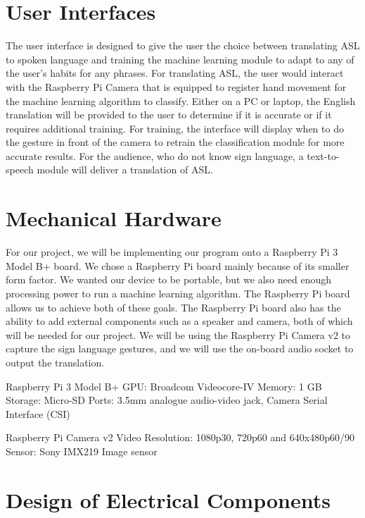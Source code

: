 \documentclass[12pt, titlepage]{article}
\begin{document}
\section{User Interfaces}

The user interface is designed to give the user the choice between translating ASL to spoken language and training the machine learning module to adapt 
to any of the user’s habits for any phrases. For translating ASL, the user would interact with the Raspberry Pi Camera that is equipped to register hand 
movement for the machine learning algorithm to classify. Either on a PC or laptop, the English translation will be provided to the user to determine if 
it is accurate or if it requires additional training. For training, the interface will display when to do the gesture in front of the camera to retrain 
the classification module for more accurate results. For the audience, who do not know sign language, a text-to-speech module will deliver a translation of ASL.

\section{Mechanical Hardware}

For our project, we will be implementing our program onto a Raspberry Pi 3 Model B+ board. We chose a Raspberry Pi board mainly because of its smaller form 
factor. We wanted our device to be portable, but we also need enough processing power to run a machine learning algorithm. The Raspberry Pi board allows us 
to achieve both of these goals. The Raspberry Pi board also has the ability to add external components such as a speaker and camera, both of which will be 
needed for our project. We will be using the Raspberry Pi Camera v2 to capture the sign language gestures, and we will use the on-board audio socket to output 
the translation.

Raspberry Pi 3 Model B+
GPU: Broadcom Videocore-IV
Memory: 1 GB
Storage: Micro-SD
Ports: 3.5mm analogue audio-video jack, Camera Serial Interface (CSI)


Raspberry Pi Camera v2
Video Resolution: 1080p30, 720p60 and 640x480p60/90
Sensor: Sony IMX219 Image sensor

\section{Design of Electrical Components}
\end{document}
